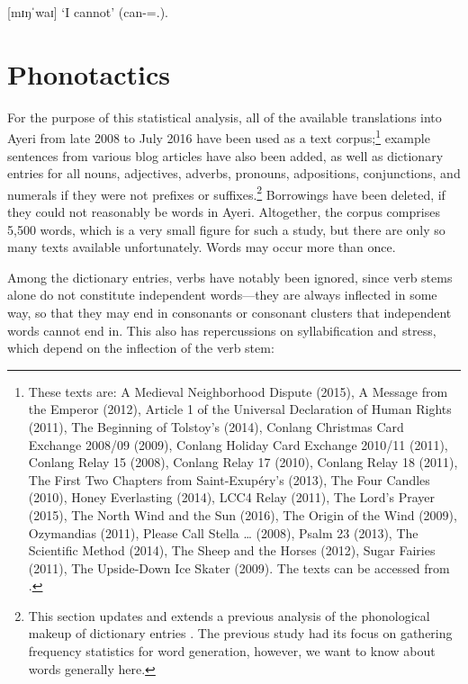 \ex
	 [mɪŋˈwaɪ] `I cannot' (can-\Neg{}=\Fsg{}.\Top{}).
\xe
{}

\section{Phonotactics}

For the purpose of this statistical analysis, all of the available translations 
into Ayeri from late 2008 to July 2016 have been used as a text 
corpus;\footnote{These texts are:
A Medieval Neighborhood Dispute (2015),
A Message from the Emperor (2012),
Article 1 of the Universal Declaration of Human Rights (2011),
The Beginning of Tolstoy's  (2014),
Conlang Christmas Card Exchange 2008/09 (2009),
Conlang Holiday Card Exchange 2010/11 (2011),
Conlang Relay 15 (2008),
Conlang Relay 17 (2010),
Conlang Relay 18 (2011),
The First Two Chapters from Saint-Exupéry's  (2013),
The Four Candles (2010),
Honey Everlasting (2014),
LCC4 Relay (2011),
The Lord's Prayer (2015),
The North Wind and the Sun (2016),
The Origin of the Wind (2009),
Ozymandias (2011),
Please Call Stella … (2008),
Psalm 23 (2013),
The Scientific Method (2014),
The Sheep and the Horses (2012),
Sugar Fairies (2011),
The Upside-Down Ice Skater (2009).
The texts can be accessed from \citet[Examples]{benung}.
} example sentences from 
various blog articles have also been added, as well as dictionary entries for 
all nouns, adjectives, adverbs, pronouns, adpositions, conjunctions, and 
numerals if they were not prefixes or suffixes.\footnote{This section updates 
and extends a previous analysis of the phonological makeup of dictionary entries 
\autocite{becker:frequency}. The previous study had its focus on gathering 
frequency statistics for word generation, however, we want to know about words 
generally here.} Borrowings have been deleted, if they could not reasonably be 
words in Ayeri. Altogether, the corpus comprises 5,500 words, which is a very 
small figure for such a study, but there are only so many texts available 
unfortunately. Words may occur more than once.

Among the dictionary entries, verbs have notably been ignored, since verb stems 
alone do not constitute independent words---they are always inflected in some 
way, so that they may end in consonants or consonant clusters that independent 
words cannot end in. This also has repercussions on syllabification and stress, 
which depend on the inflection of the verb stem:

